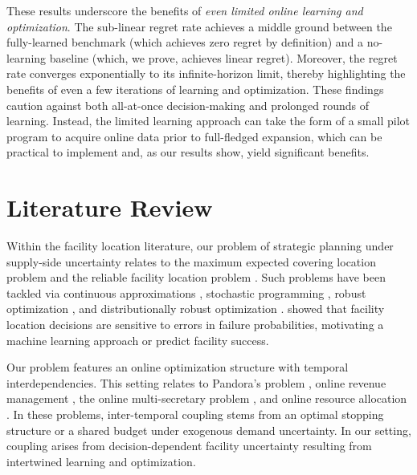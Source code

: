 \documentclass[blindrev]{informs3noheader}
\begin{document}
These results underscore the benefits of \textit{even limited online learning and optimization}. The sub-linear regret rate achieves a middle ground between the fully-learned benchmark (which achieves zero regret by definition) and a no-learning baseline (which, we prove, achieves linear regret). Moreover, the regret rate converges exponentially to its infinite-horizon limit, thereby highlighting the benefits of even a few iterations of learning and optimization. These findings caution against both all-at-once decision-making and prolonged rounds of learning. Instead, the limited learning approach can take the form of a small pilot program to acquire online data prior to full-fledged expansion, which can be practical to implement and, as our results show, yield significant benefits.

\section{Literature Review}

Within the facility location literature, our problem of strategic planning under supply-side uncertainty relates to the maximum expected covering location problem \citep{daskin1983maximum} and the reliable facility location problem \citep{snyder2005reliability}. Such problems have been tackled via continuous approximations \citep{cui2010reliable}, stochastic programming \citep{laporte1994exact,shen2011reliable}, robust optimization \citep{cheng2021robust}, and distributionally robust optimization \citep{lu2015reliable}. \cite{lim2013facility} showed that facility location decisions are sensitive to errors in failure probabilities, motivating a machine learning approach or predict facility success.

Our problem features an online optimization structure with temporal interdependencies. This setting relates to Pandora's problem \citep{brown2024sequential}, online revenue management \citep{jasin2012re,bumpensanti2020re}, the online multi-secretary problem \citep{arlotto2019uniformly}, and online resource allocation \citep{vera2021bayesian,banerjee2019good,baxi2024online}. In these problems, inter-temporal coupling stems from an optimal stopping structure or a shared budget under exogenous demand uncertainty. In our setting, coupling arises from decision-dependent facility uncertainty resulting from intertwined learning and optimization.
\end{document}
